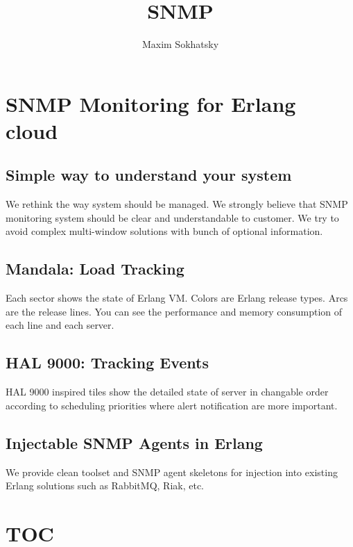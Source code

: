 \documentclass[11pt]{article}
\begin{document}
\title{SNMP}
\author{Maxim Sokhatsky}

\section*{SNMP Monitoring for Erlang cloud}
\subsection*{Simple way to understand your system}
We rethink the way system should be managed. We strongly believe that
SNMP monitoring system should be clear and understandable to customer.
We try to avoid complex multi-window solutions with bunch of optional information.

\subsection*{Mandala: Load Tracking}

Each sector shows the state of Erlang VM. Colors are Erlang release types.
Arcs are the release lines. You can see the performance and memory
consumption of each line and each server.

\subsection*{HAL 9000: Tracking Events}

HAL 9000 inspired tiles show the detailed state of server in changable
order according to scheduling priorities where alert notification are more
important.

\subsection*{Injectable SNMP Agents in Erlang}
We provide clean toolset and SNMP agent skeletons for injection into existing Erlang
solutions such as RabbitMQ, Riak, etc.

\section*{TOC}
\paragraph{}
 \@br
{} \@br
{} \@br
{} \@br
{} \@br

\end{document}
